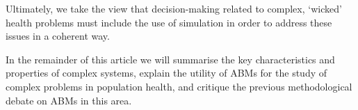 \documentclass[review]{elsarticle}
\begin{document}
Ultimately, we take the view that decision-making related to complex, `wicked' health problems must include the use of simulation in order to address these issues in a coherent way. 

  


In the remainder of this article we will summarise the key characteristics and properties of complex systems, explain the utility of ABMs for the study of complex problems in population health, and critique the previous methodological debate on ABMs in this area.
\end{document}
